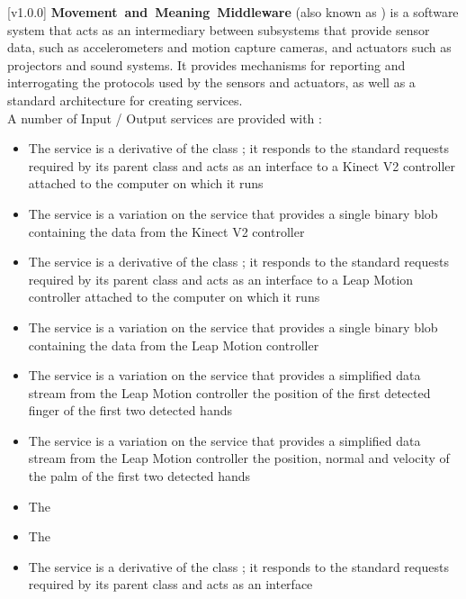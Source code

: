[v1.0.0]
\textbf{Movement~and~Meaning~Middleware} (also known as \mplusm{}) is a software system
that acts as an intermediary between subsystems that provide sensor data, such as
accelerometers and motion capture cameras, and actuators such as projectors and sound
systems.
It provides mechanisms for reporting and interrogating the protocols used by the sensors
and actuators, as well as a standard architecture for creating services.\\

A number of Input / Output services are provided with \mplusm:
\begin{itemize}
\item The \textbf{\KVtwoI} service is a derivative of the \mplusm{} class
;
it responds to the standard requests required by its parent class and acts as an interface
to a Kinect V2 controller attached to the computer on which it runs
\item\exSp{}The \textbf{\KVtwoBI} service is a variation on the \KVtwoI{} service that
provides a single binary blob containing the data from the Kinect V2 controller
\item\exSp{}The \textbf{\LMI} service is a derivative of the \mplusm{} class
;
it responds to the standard requests required by its parent class and acts as an interface
to a Leap Motion controller attached to the computer on which it runs
\item\exSp{}The \textbf{\LBI} service is a variation on the \LMI{} service that provides a
single binary blob containing the data from the Leap Motion controller
\item\exSp{}The \textbf{\LTFI} service is a variation on the \LMI{} service that provides
a simplified data stream from the Leap Motion controller \longDash{} the position of the
first detected finger of the first two detected hands
\item\exSp{}The \textbf{\LTPI} service is a variation on the \LMI{} service that provides
a simplified data stream from the Leap Motion controller \longDash{} the position, normal
and velocity of the palm of the first two detected hands
\item\exSp{}The \textbf{\LFI}
\item\exSp{}The \textbf{\LDO}
\item\exSp{}The \textbf{\NNI} service is a derivative of the \mplusm{} class
;
it responds to the standard requests required by its parent class and acts as an interface

\end{itemize}
